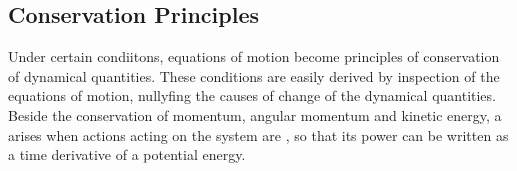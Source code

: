 \documentclass[letterpaper,10pt,english]{jupyterBook}
\begin{document}
\subsection{Conservation Principles}
\label{\detokenize{ch/dynamics-eom:conservation-principles}}\label{\detokenize{ch/dynamics-eom:classical-mechanics-dynamics-eom-conservation}}
\sphinxAtStartPar
Under certain condiitons, equations of motion become principles of conservation of dynamical quantities. These conditions are easily derived by inspection of the equations of motion, nullyfing the causes of change of the dynamical quantities. Beside the conservation of momentum, angular momentum and kinetic energy, a  arises when actions acting on the system are {\hyperref[\detokenize{ch/actions-conservative:classical-mechanics-actions-conservative}]{}}, so that its power can be written as a time derivative of a potential energy.
\end{document}
